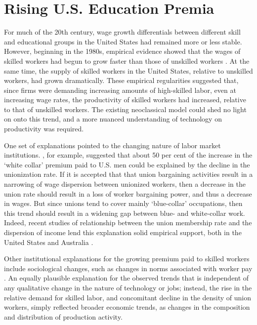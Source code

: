 \section{Rising U.S. Education Premia}

For much of the 20th century, wage growth differentials between different skill and educational groups in the United States had remained more or less stable. However, beginning in the 1980s, empirical evidence showed that the wages of skilled workers had begun to grow faster than those of unskilled workers \citep{Juhn1993}. At the same time, the supply of skilled workers in the United States, relative to unskilled workers, had grown dramatically. These empirical regularities suggested that, since firms were demanding increasing amounts of high-skilled labor, even at increasing wage rates, the productivity of skilled workers had increased, relative to that of unskilled workers. The existing neoclassical model could shed no light on onto this trend, and a more nuanced understanding of technology on productivity was required.

One set of explanations pointed to the changing nature of labor market institutions. \citet{Freeman1994}, for example, suggested that about 50 per cent of the increase in the `white collar' premium paid to U.S. men could be explained by the decline in the unionization rate. If it is accepted that that union bargaining activities result in a narrowing of wage dispersion between unionized workers, then a decrease in the union rate should result in a loss of worker bargaining power, and thus a decrease in wages. But since unions tend to cover mainly `blue-collar' occupations, then this trend should result in a widening gap between blue- and white-collar work. Indeed, recent studies of relationship between the union membership rate and the dispersion of income lend this explanation solid empirical support, both in the United States \citep{Card2004,DiNardo1996} and Australia \citep{Borland1996}.

Other institutional explanations for the growing premium paid to skilled workers include sociological changes, such as changes in norms associated with worker pay \citep{Mitchell1989}. An equally plausible explanation for the observed trends that is independent of any qualitative change in the nature of technology or jobs; instead, the rise in the relative demand for skilled labor, and concomitant decline in the density of union workers,  simply reflected broader economic trends, as changes in the composition and distribution of production activity.

